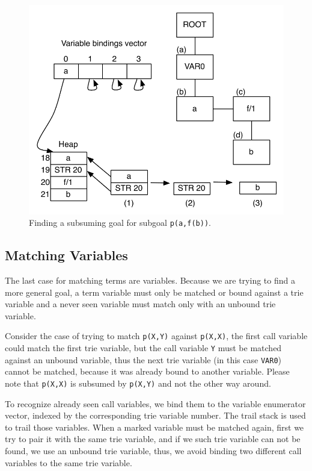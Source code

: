\begin{figure}[ht]
  \centering
    \includegraphics[scale=0.6]{match_functor.pdf}
  \caption{Finding a subsuming goal for subgoal \texttt{p(a,f(b))}.}
  \label{fig:match_functor}
\end{figure}

\subsection{Matching Variables}

The last case for matching terms are variables. Because we are trying to find a more general goal,
a term variable must only be matched or bound against a trie variable and a
never seen variable must match only with an unbound trie variable.

Consider the case of trying to match \texttt{p(X,Y)} against \texttt{p(X,X)},
the first call variable could match the first trie variable,
but the call variable \texttt{Y} must be matched against an unbound variable, thus the next trie variable
(in this case \texttt{VAR0}) cannot be matched, because it was already bound to another variable.
Please note that \texttt{p(X,X)} is subsumed by \texttt{p(X,Y)} and not the other way around.

To recognize already seen call variables, we bind them to the variable enumerator vector, indexed
by the corresponding trie variable number. The trail stack is used to trail those variables.
When a marked variable must be matched again, first we try to pair it with the same trie variable,
and if we such trie variable can not be found, we use an unbound trie variable, thus,
we avoid binding two different call variables to the same trie variable.

